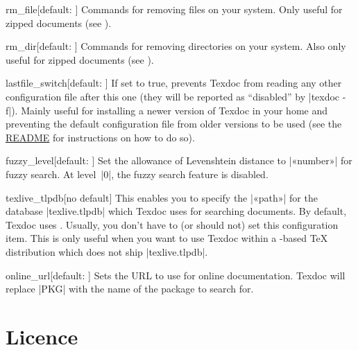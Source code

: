 \documentclass{texdoc-doc}
\begin{document}
\begin{confitem}{rm\_file}{}[default: ]
Commands for removing files on your system. Only useful for zipped documents
(see ).
\end{confitem}

\begin{confitem}{rm\_dir}{}[default: ]
Commands for removing directories on your system. Also only useful for zipped
documents (see ).
\end{confitem}

\begin{confitem}{lastfile\_switch}{}[default: ]
If set to true, prevents Texdoc from reading any other configuration file after
this one (they will be reported as ``disabled'' by |texdoc -f|). Mainly useful
for installing a newer version of Texdoc in your home and preventing the
default configuration file from older versions to be used (see the
\href{https://github.com/TeX-Live/texdoc}{README} for instructions on how to do
so).
\end{confitem}

\begin{confitem}{fuzzy\_level}{}[default: ]
Set the allowance of Levenshtein distance to |«number»| for fuzzy search. At
level~|0|, the fuzzy search feature is disabled.
\end{confitem}

\begin{confitem}{texlive\_tlpdb}{}[no default]
This enables you to specify the |«path»| for the database |texlive.tlpdb| which
Texdoc uses for searching documents. By default, Texdoc uses
. Usually, you don't have to (or should
not) set this configuration item. This is only useful when you want to use
Texdoc within a {\TL}-based {\TeX} distribution which does not ship
|texlive.tlpdb|.
\end{confitem}

\begin{confitem}{online\_url}{}[default: ]
Sets the URL to use for online documentation. Texdoc will replace |PKG| with
the name of the package to search for.
\end{confitem}

\section{Licence}
\label{sec:licence}
\end{document}
